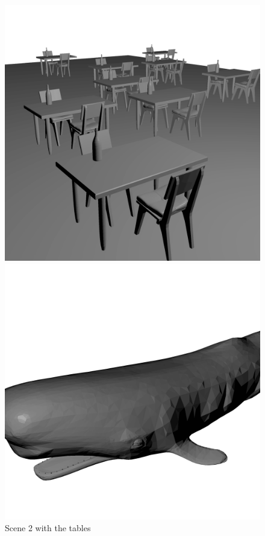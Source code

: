 \documentclass{vgtc}
\begin{document}
\begin{figure}[!hbt]
\centering
{}%
  \includegraphics[width=\linewidth]{several_kitchen.png}
  \caption{Scene 2 with the tables}\label{fig:tables}
\endminipage
{}
  \includegraphics[width=\linewidth]{whale.png}

\end{figure}
\end{document}
